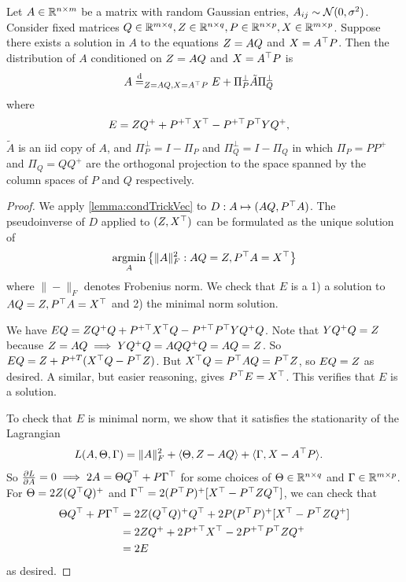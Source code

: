 \documentclass[main.tex]{subfiles}
\begin{document}
\begin{lemma}\label{lemma:condTrick}
Let $A \in \mathbb{R}^{n \times m}$ be a matrix with random Gaussian entries, $A_{ij} \sim \mathcal{N}(0, \sigma^2)$.
Consider fixed matrices $Q \in \mathbb{R}^{m \times q}, Z \in \mathbb{R}^{n \times q}, P \in \mathbb{R}^{n \times p}, X \in \mathbb{R}^{m \times p}$.
Suppose there exists a solution in $A$ to the equations $Z = AQ$ and $X = A^\top P$.
Then the distribution of $A$ conditioned on $Z = AQ$ and $X = A^\top P$ is
\begin{align*}
    A &\overset{\mathrm{d}}{=}_{Z=AQ, X=A^\top P} E + \Pi_P^\perp \tilde A \Pi_Q^\perp
\end{align*}
where
\begin{align*}
    E
        &=
            Z Q^+
            + P^{+\top} X^\top
            - P^{+\top} P^\top
                YQ^+,
\end{align*}
$\tilde A$ is an iid copy of $A$,
and $\Pi_P^\perp = I - \Pi_P$ and $\Pi_Q^\perp = I - \Pi_Q$ in which $\Pi_P = PP^+$ and $\Pi_Q = QQ^+$ are the orthogonal projection to the space spanned by the column spaces of $P$ and $Q$ respectively.
\end{lemma}
\begin{proof}
We apply \cref{lemma:condTrickVec} to $D: A \mapsto (AQ, P^\top A)$.
The pseudoinverse of $D$ applied to $(Z, X^\top)$ can be formulated as the unique solution of
\begin{align*}
    \operatorname*{argmin}_A \left\{ \|A\|^2_F : AQ = Z, P^\top A = X^\top \right\}
\end{align*}
where $\|-\|_F$ denotes Frobenius norm.
We check that $E$ is a 1) a solution to $AQ = Z, P^\top A = X^\top$ and 2) the minimal norm solution.

We have $EQ = 
        Z Q^+Q
            + P^{+\top} X^\top Q
            - P^{+\top} P^\top
                YQ^+Q$.
Note that $YQ^+Q = Z$ because $Z=AQ \implies YQ^+ Q = AQQ^+Q = AQ = Z$.
So $EQ = Z + P^{+T} (X^\top Q - P^\top Z)$.
But $X^\top Q = P^\top A Q = P^\top Z$, so $EQ = Z$ as desired.
A similar, but easier reasoning, gives $P^\top E = X^\top$.
This verifies that $E$ is a solution.

To check that $E$ is minimal norm, we show that it satisfies the stationarity of the Lagrangian
\begin{align*}
    L(A, \Theta, \Gamma)
        &=
            \|A\|^2_F + \langle \Theta, Z - AQ \rangle + \langle \Gamma, X - A^\top P\rangle.
\end{align*}
So $\frac{\partial L}{\partial A} = 0 \implies 2A = \Theta Q^\top + P \Gamma^\top$ for some choices of $\Theta \in \mathbb{R}^{n \times q}$ and $\Gamma \in \mathbb{R}^{m \times p}$.
For $\Theta = 2 Z (Q^\top Q)^+$ and $\Gamma^\top = 2(P^\top P)^+ [ X^\top - P^\top Z Q^\top]$, we can check that
\begin{align*}
    \Theta Q^\top + P \Gamma^\top
        &=
            2 Z (Q^\top Q)^+ Q^\top + 2P(P^\top P)^+ [ X^\top - P^\top Z Q^+] \\
        &=
            2 Z Q^+ + 2 P^{+\top} X^\top - 2P^{+\top} P^\top Z Q^+\\
        &=
            2E
\end{align*}
as desired.
\end{proof}
\end{document}
